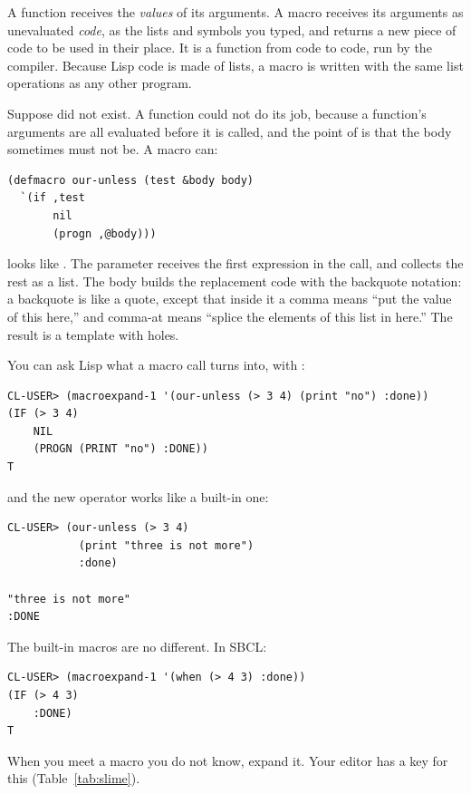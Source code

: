 A function receives the \emph{values} of its arguments. A macro
receives its arguments as unevaluated \emph{code}, as the lists and
symbols you typed, and returns a new piece of code to be used in their
place. It is a function from code to code, run by the compiler.
Because Lisp code is made of lists, a macro is written with the same
list operations as any other program.

Suppose  did not exist. A function could not do its job,
because a function's arguments are all evaluated before it is called,
and the point of  is that the body sometimes must not be.
A macro can:

\begin{verbatim}
(defmacro our-unless (test &body body)
  `(if ,test
       nil
       (progn ,@body)))
\end{verbatim}

 looks like . The parameter 
receives the first expression in the call, and  collects
the rest as a list. The body builds the replacement code with the
backquote notation: a backquote is like a quote, except that inside
it a comma means ``put the value of this here,'' and comma-at means
``splice the elements of this list in here.'' The result is a
template with holes.

You can ask Lisp what a macro call turns into, with
:

\begin{verbatim}
CL-USER> (macroexpand-1 '(our-unless (> 3 4) (print "no") :done))
(IF (> 3 4)
    NIL
    (PROGN (PRINT "no") :DONE))
T
\end{verbatim}

\noindent
and the new operator works like a built-in one:

\begin{verbatim}
CL-USER> (our-unless (> 3 4)
           (print "three is not more")
           :done)

"three is not more"
:DONE
\end{verbatim}

The built-in macros are no different. In SBCL:

\begin{verbatim}
CL-USER> (macroexpand-1 '(when (> 4 3) :done))
(IF (> 4 3)
    :DONE)
T
\end{verbatim}

When you meet a macro you do not know, expand it. Your editor has a
key for this (Table~\ref{tab:slime}).

